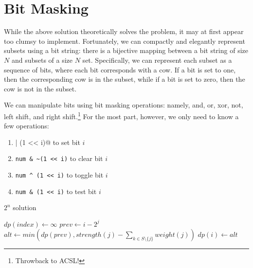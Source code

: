 \documentclass{article}
\begin{document}

\section{Bit Masking}

While the above solution theoretically solves the problem, it may at first appear too clumsy to implement. Fortunately, we can compactly and elegantly represent subsets using a bit string: there is a bijective mapping between a bit string of size $N$ and subsets of a size $N$ set. Specifically, we can represent each subset as a sequence of bits, where each bit corresponds with a cow. If a bit is set to one, then the corresponding cow is in the subset, while if a bit is set to zero, then the cow is not in the subset.

We can manipulate bits using bit masking operations: namely, and, or, xor, not, left shift, and right shift.\footnote{Throwback to ACSL!} For the most part, however, we only need to know a few operations:

\begin{enumerate}
    \item \verb@num | (1 << i)@ to set bit $i$
    \item \verb|num & ~(1 << i)| to clear bit $i$
    \item \verb|num ^ (1 << i)| to toggle bit $i$
    \item \verb|num & (1 << i)| to test bit $i$
\end{enumerate}



\begin{algorithm}[H]
\caption{$2^n$ solution}
\begin{algorithmic}
        \State $dp(index) \gets \infty$
            \State $prev \gets i-2^j$
            \State $alt \gets min(dp(prev), strength(j)-\sum_{k \in S \setminus \{j\}} weight(j))$
                \State $dp(i) \gets alt$
            \EndIf
        \EndFor
    \EndFor
\end{algorithmic}
\end{algorithm}
\end{document}
